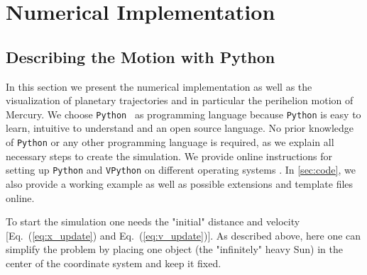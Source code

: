 \documentclass[12pt,ngerman,american]{iopart}
\newcommand{\python}[0]{\texttt{Python}}
\newcommand{\vpython}[0]{\texttt{VPython}}
\begin{document}



\section{Numerical Implementation}\label{sec:Numerical Implementation}

\subsection{Describing the Motion with Python}

In this section we present the numerical implementation as well as the visualization of planetary trajectories and in
particular the perihelion motion of Mercury.
We choose \python{}~\cite{Python} as programming language because \python{} is easy to learn, intuitive to understand and an open source language.
No prior knowledge of \python{} or any other programming language is required, as we explain all necessary steps to create the simulation.
We provide online instructions for setting up \python{} and \vpython{} on different operating systems \cite{scripts}.
In \ref{sec:code}, we also provide a working example as well as possible extensions and template files online.

To start the simulation one needs the "initial" distance and velocity [Eq.~(\ref{eq:x_update}) and Eq.~(\ref{eq:v_update})].
As described above, here one can simplify the problem by placing one object (the "infinitely" heavy Sun) in the center of the coordinate system and keep it fixed.
\end{document}
